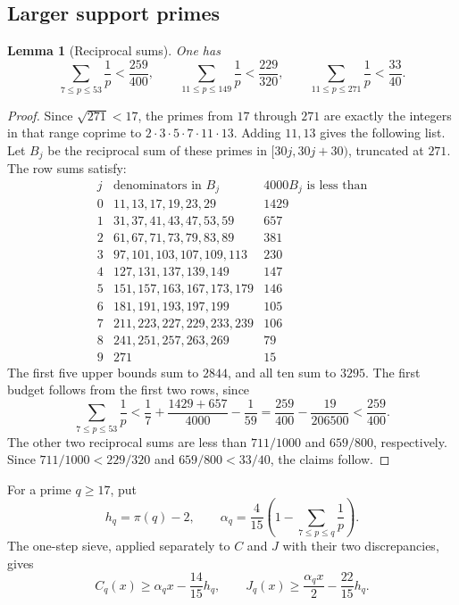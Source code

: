 \documentclass[11pt]{article}
\numberwithin{equation}{section}
\newtheorem{lemma}[theorem]{Lemma}
\theoremstyle{definition}\newtheorem{definition}[theorem]{Definition}
\theoremstyle{remark}\newtheorem{remark}[theorem]{Remark}
\begin{document}
\subsection{Larger support primes}\label{arith:sec:no-core-closure}

\begin{lemma}[Reciprocal sums]
\label{arith:lem:no-core-reciprocals}
One has
\[
 \sum_{7\le p\le53}\frac1p<\frac{259}{400},\qquad
 \sum_{11\le p\le149}\frac1p<\frac{229}{320},\qquad
 \sum_{11\le p\le271}\frac1p<\frac{33}{40}.
\]
\end{lemma}
\begin{proof}
Since $\sqrt{271}<17$, the primes from $17$ through $271$ are
exactly the integers in that range coprime to $2\cdot3\cdot5\cdot7\cdot11\cdot13$.
Adding $11,13$ gives the following list.
Let $B_j$ be the reciprocal sum of these primes in
$[30j,30j+30)$, truncated at $271$.  The row sums satisfy:
\[
\begin{array}{c|l|r}
j&\text{denominators in }B_j&4000B_j\text{ is less than}\\\hline
0&11,13,17,19,23,29&1429\\
1&31,37,41,43,47,53,59&657\\
2&61,67,71,73,79,83,89&381\\
3&97,101,103,107,109,113&230\\
4&127,131,137,139,149&147\\
5&151,157,163,167,173,179&146\\
6&181,191,193,197,199&105\\
7&211,223,227,229,233,239&106\\
8&241,251,257,263,269&79\\
9&271&15
\end{array}
\]
The first five upper bounds sum to $2844$, and all ten sum to $3295$.
The first budget follows from the first two rows, since
\[
 \sum_{7\le p\le53}\frac1p
 <\frac17+\frac{1429+657}{4000}-\frac1{59}
 =\frac{259}{400}-\frac{19}{206500}<\frac{259}{400}.
\]
The other two reciprocal sums are less than $711/1000$ and
$659/800$, respectively.  Since
$711/1000<229/320$ and $659/800<33/40$, the claims follow.
\end{proof}

For a prime $q\ge17$, put
\[
 h_q=\pi(q)-2,\qquad
 \alpha_q=\frac4{15}\left(1-\sum_{7\le p\le q}\frac1p\right).
\]
The one-step sieve, applied separately to $C$ and $J$ with their two
discrepancies, gives
\[
 C_q(x)\ge\alpha_qx-\frac{14}{15}h_q,
 \qquad
 J_q(x)\ge\frac{\alpha_qx}{2}-\frac{22}{15}h_q.
\]
\end{document}
